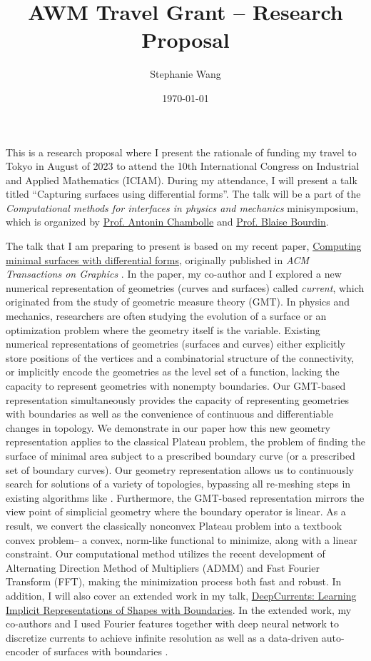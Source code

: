 \documentclass[12pt,a4paper]{article}
\title{AWM Travel Grant -- Research Proposal}
\author{Stephanie Wang}
\date{\today}
\begin{document}
This is a research proposal where I present the rationale of funding my travel to Tokyo in August of 2023 to attend the 10th International Congress on Industrial and Applied Mathematics (ICIAM). 
During my attendance, I will present a talk titled ``Capturing surfaces using differential forms''.  
The talk will be a part of the \emph{Computational methods for interfaces in physics and mechanics} minisymposium, which is organized by \href{http://www.cmap.polytechnique.fr/~antonin/}{Prof. Antonin Chambolle} and \href{https://ms.mcmaster.ca/~bourdinb/}{Prof. Blaise Bourdin}.  
 
The talk that I am preparing to present is based on my recent paper, \href{https://dl.acm.org/doi/10.1145/3450626.3459781}{Computing minimal surfaces with differential forms}, originally published in \emph{ACM Transactions on Graphics} \cite{Wang:2021}.
In the paper, my co-author and I explored a new numerical representation of geometries (curves and surfaces) called \emph{current}, which originated from the study of geometric measure theory (GMT).  
In physics and mechanics, researchers are often studying the evolution of a surface or an optimization problem where the geometry itself is the variable.   
Existing numerical representations of geometries (surfaces and curves) either explicitly store positions of the vertices and a combinatorial structure of the connectivity, or implicitly encode the geometries as the level set of a function, lacking the capacity to represent geometries with nonempty boundaries.  
Our GMT-based representation simultaneously provides the capacity of representing geometries with boundaries as well as the convenience of continuous and differentiable changes in topology.  
We demonstrate in our paper how this new geometry representation applies to the classical Plateau problem, the problem of finding the surface of minimal area subject to a prescribed boundary curve (or a prescribed set of boundary curves). 
Our geometry representation allows us to continuously search for solutions of a variety of topologies, bypassing all re-meshing steps in existing algorithms like \cite{pinkall1993minsurfaces}.   
Furthermore, the GMT-based representation mirrors the view point of simplicial geometry where the boundary operator is linear.  
As a result, we convert the classically nonconvex Plateau problem into a textbook convex problem-- a convex, norm-like functional to minimize, along with a linear constraint.  
Our computational method utilizes the recent development of Alternating Direction Method of Multipliers (ADMM) \cite{Goldstein:2014:ADMM} and Fast Fourier Transform (FFT), making the minimization process both fast and robust.  
In addition, I will also cover an extended work in my talk, \href{https://openaccess.thecvf.com/content/CVPR2022/papers/Palmer_DeepCurrents_Learning_Implicit_Representations_of_Shapes_With_Boundaries_CVPR_2022_paper.pdf}{DeepCurrents: Learning Implicit Representations of Shapes with Boundaries}.  
In the extended work, my co-authors and I used Fourier features together with deep neural network to discretize currents to achieve infinite resolution as well as a data-driven auto-encoder of surfaces with boundaries \cite{Palmer:2022}. 
\end{document}
